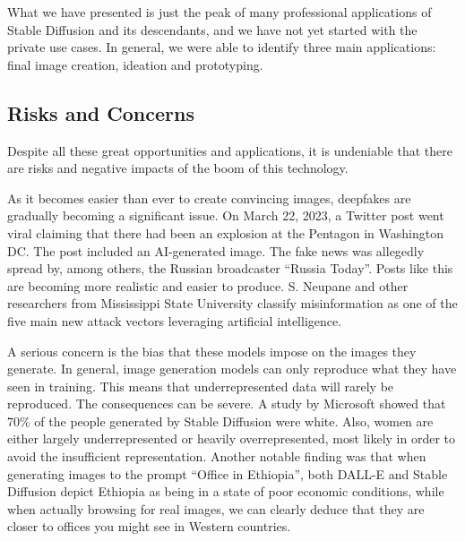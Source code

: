 \documentclass[11pt]{article}
\begin{document}
What we have presented is just the peak of many professional applications of Stable Diffusion and its descendants, and we have not yet started with the private use cases. In general, we were able to identify three main applications: final image creation, ideation and prototyping.

\subsection{Risks and Concerns}
Despite all these great opportunities and applications, it is undeniable that there are risks and negative impacts of the boom of this technology.

As it becomes easier than ever to create convincing images, deepfakes are gradually becoming a significant issue. On March 22, 2023, a Twitter post went viral claiming that there had been an explosion at the Pentagon in Washington DC. The post included an AI-generated image. The fake news was allegedly spread by, among others, the Russian broadcaster ``Russia Today''\cite{correctiv2023pentagonexplosion}. Posts like this are becoming more realistic and easier to produce. S. Neupane and other researchers from Mississippi State University\cite{neupane2023impactsriskgenerativeai} classify misinformation as one of the five main new attack vectors leveraging artificial intelligence.

A serious concern is the bias that these models impose on the images they generate. In general, image generation models can only reproduce what they have seen in training. This means that underrepresented data will rarely be reproduced. The consequences can be severe. A study by Microsoft\cite{naik2023socialbiasesthroughtexttoimage} showed that 70\% of the people generated by Stable Diffusion were white. Also, women are either largely underrepresented or heavily overrepresented, most likely in order to avoid the insufficient representation. Another notable finding was that when generating images to the prompt ``Office in Ethiopia'', both DALL-E and Stable Diffusion depict Ethiopia as being in a state of poor economic conditions, while when actually browsing for real images, we can clearly deduce that they are closer to offices you might see in Western countries.
\end{document}
